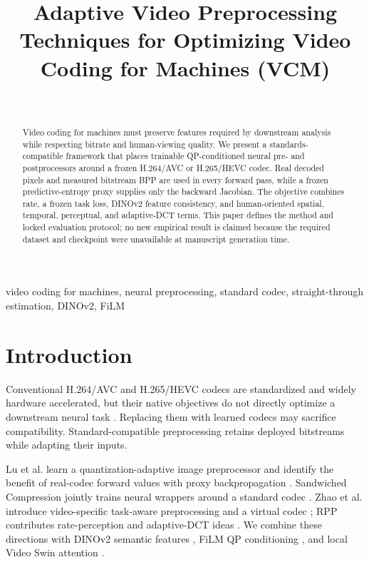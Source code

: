 \documentclass[conference]{IEEEtran}
\title{Adaptive Video Preprocessing Techniques for Optimizing Video Coding for Machines (VCM)}
\author{\IEEEauthorblockN{Anonymous Author(s)}\\\IEEEauthorblockA{Identities pending human approval}}
\begin{document}
\maketitle
\begin{center}
\end{center}

\begin{abstract}
Video coding for machines must preserve features required by downstream analysis while respecting bitrate and human-viewing quality. We present a standards-compatible framework that places trainable QP-conditioned neural pre- and postprocessors around a frozen H.264/AVC or H.265/HEVC codec. Real decoded pixels and measured bitstream BPP are used in every forward pass, while a frozen predictive-entropy proxy supplies only the backward Jacobian. The objective combines rate, a frozen task loss, DINOv2 feature consistency, and human-oriented spatial, temporal, perceptual, and adaptive-DCT terms. This paper defines the method and locked evaluation protocol; no new empirical result is claimed because the required dataset and checkpoint were unavailable at manuscript generation time.
\end{abstract}

\begin{IEEEkeywords}
video coding for machines, neural preprocessing, standard codec, straight-through estimation, DINOv2, FiLM
\end{IEEEkeywords}

\section{Introduction}
Conventional H.264/AVC and H.265/HEVC codecs are standardized and widely hardware accelerated, but their native objectives do not directly optimize a downstream neural task \cite{wiegand2003avc,sullivan2012hevc}. Replacing them with learned codecs may sacrifice compatibility. Standard-compatible preprocessing retains deployed bitstreams while adapting their inputs.

Lu et al. learn a quantization-adaptive image preprocessor and identify the benefit of real-codec forward values with proxy backpropagation \cite{lu2024preprocessing}. Sandwiched Compression jointly trains neural wrappers around a standard codec \cite{guleryuz2024sandwiched}. Zhao et al. introduce video-specific task-aware preprocessing and a virtual codec \cite{zhao2025video}; RPP contributes rate-perception and adaptive-DCT ideas \cite{ma2023rpp}. We combine these directions with DINOv2 semantic features \cite{oquab2023dinov2}, FiLM QP conditioning \cite{perez2018film}, and local Video Swin attention \cite{liu2022video}.
\end{document}
